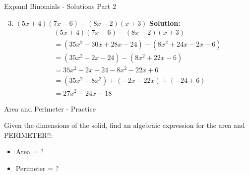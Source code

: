 \documentclass[aspectratio=169]{beamer}
\begin{document}
\begin{frame}{Expand Binomials - Solutions Part 2}
    \begin{tcolorbox}[colback=lightgray,colframe=accent,title=Detailed Solutions]
        \footnotesize
        \begin{enumerate}
            \setcounter{enumi}{2}
            \setlength{\itemsep}{0.5em}
            \item $(5x + 4)(7x - 6) - (8x - 2)(x + 3)$
            \quad \textbf{Solution:}
            \begin{align*}
                & (5x + 4)(7x - 6) - (8x - 2)(x + 3) \\
                &= (35x^2 - 30x + 28x - 24) - (8x^2 + 24x - 2x - 6) \\
                &= (35x^2 - 2x - 24) - (8x^2 + 22x - 6) \\
                &= 35x^2 - 2x - 24 - 8x^2 - 22x + 6 \\
                &= (35x^2 - 8x^2) + (-2x - 22x) + (-24 + 6) \\
                &= 27x^2 - 24x - 18
            \end{align*}
        \end{enumerate}
    \end{tcolorbox}
\end{frame}

\begin{frame}{Area and Perimeter - Practice}
    \begin{tcolorbox}[colback=lightgray,colframe=primary,title=Practice Problem]
        \footnotesize
        Given the dimensions of the solid, find an algebraic expression for the area and PERIMETER!!:
        
        \begin{center}
        \end{center}
        
        \begin{itemize}
            \item Area = ?
            \item Perimeter = ?
        \end{itemize}
    \end{tcolorbox}
\end{frame}
\end{document}
